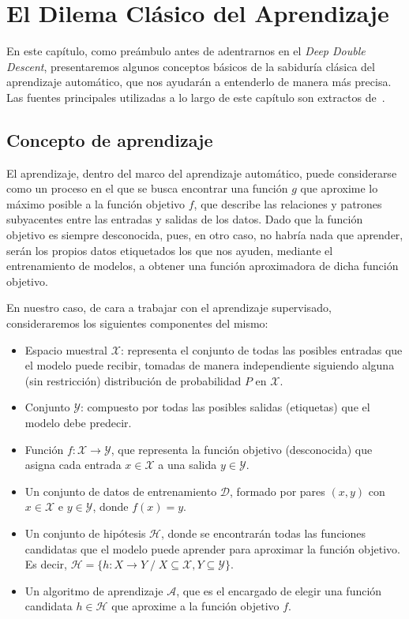 \chapter{El Dilema Clásico del Aprendizaje}\label{ch:dilema-aprendizaje}

En este capítulo, como preámbulo antes de adentrarnos en el \textit{Deep Double Descent}, presentaremos algunos conceptos básicos de la sabiduría clásica del aprendizaje automático, que nos ayudarán a entenderlo de manera más precisa. Las fuentes principales utilizadas a lo largo de este capítulo son extractos de~\cite{Mostafa2012, Bishop2006}.

\section{Concepto de aprendizaje}\label{sec:concepto-de-aprendizaje}
El aprendizaje, dentro del marco del aprendizaje automático, puede considerarse como un proceso en el que se busca encontrar una función $g$ que aproxime lo máximo posible a la función objetivo $f$, que describe las relaciones y patrones subyacentes entre las entradas y salidas de los datos. Dado que la función objetivo es siempre desconocida, pues, en otro caso, no habría nada que aprender, serán los propios datos etiquetados los que nos ayuden, mediante el entrenamiento de modelos, a obtener una función aproximadora de dicha función objetivo.

En nuestro caso, de cara a trabajar con el aprendizaje supervisado, consideraremos los siguientes componentes del mismo:
\begin{itemize}
    \item Espacio muestral $\mathcal{X}$: representa el conjunto de todas las posibles entradas que el modelo puede recibir, tomadas de manera independiente siguiendo alguna (sin restricción) distribución de probabilidad $P$ en $\mathcal{X}$.
    \item Conjunto $\mathcal{Y}$: compuesto por todas las posibles salidas (etiquetas) que el modelo debe predecir.
    \item Función $f: \mathcal{X} \rightarrow \mathcal{Y}$, que representa la función objetivo (desconocida) que asigna cada entrada $x \in \mathcal{X}$ a una salida $y \in \mathcal{Y}$.
    \item Un conjunto de datos de entrenamiento $\mathcal{D}$, formado por pares $(x, y)$ con $x \in \mathcal{X}$ e $y \in \mathcal{Y}$, donde $f(x) = y$.
    \item Un conjunto de hipótesis $\mathcal{H}$, donde se encontrarán todas las funciones candidatas que el modelo puede aprender para aproximar la función objetivo. Es decir, $\mathcal{H} = \{h: X \rightarrow Y \; / \; X \subseteq \mathcal{X}, Y \subseteq \mathcal{Y}\}$. 
    \item Un algoritmo de aprendizaje $\mathcal{A}$, que es el encargado de elegir una función candidata $h \in \mathcal{H}$ que aproxime a la función objetivo $f$.
\end{itemize}

